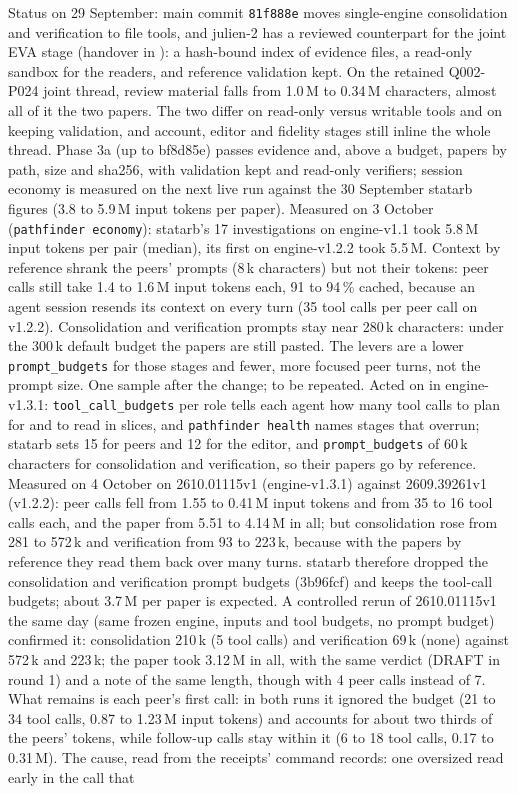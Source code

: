 \documentclass[11pt,a4paper]{article}
\begin{document}
\begin{enumerate}[label=\textbf{D\arabic*}]
  Status on 29 September: main commit \texttt{81f888e} moves single-engine
  consolidation and verification to file tools, and julien-2 has a reviewed
  counterpart for the joint EVA stage (handover in
  ):
  a hash-bound index of evidence files, a read-only sandbox for the readers, and
  reference validation kept. On the retained Q002-P024 joint thread, review
  material falls from 1.0\,M to 0.34\,M characters, almost all of it the two
  papers. The two differ on read-only versus writable tools and on keeping
  validation, and account, editor and fidelity stages still inline the whole
  thread.
  Phase 3a (up to bf8d85e) passes evidence and, above a budget, papers by path, size and sha256, with validation kept and read-only verifiers; session economy is measured on the next live run against the 30 September statarb figures (3.8 to 5.9\,M input tokens per paper). Measured on 3 October (\texttt{pathfinder economy}): statarb's 17 investigations on engine-v1.1 took 5.8\,M input tokens per pair (median), its first on engine-v1.2.2 took 5.5\,M. Context by reference shrank the peers' prompts (8\,k characters) but not their tokens: peer calls still take 1.4 to 1.6\,M input tokens each, 91 to 94\,\% cached, because an agent session resends its context on every turn (35 tool calls per peer call on v1.2.2). Consolidation and verification prompts stay near 280\,k characters: under the 300\,k default budget the papers are still pasted. The levers are a lower \texttt{prompt\_budgets} for those stages and fewer, more focused peer turns, not the prompt size. One sample after the change; to be repeated. Acted on in engine-v1.3.1: \texttt{tool\_call\_budgets} per role tells each agent how many tool calls to plan for and to read in slices, and \texttt{pathfinder health} names stages that overrun; statarb sets 15 for peers and 12 for the editor, and \texttt{prompt\_budgets} of 60\,k characters for consolidation and verification, so their papers go by reference. Measured on 4 October on 2610.01115v1 (engine-v1.3.1) against 2609.39261v1 (v1.2.2): peer calls fell from 1.55 to 0.41\,M input tokens and from 35 to 16 tool calls each, and the paper from 5.51 to 4.14\,M in all; but consolidation rose from 281 to 572\,k and verification from 93 to 223\,k, because with the papers by reference they read them back over many turns. statarb therefore dropped the consolidation and verification prompt budgets (3b96fcf) and keeps the tool-call budgets; about 3.7\,M per paper is expected. A controlled rerun of 2610.01115v1 the same day (same frozen engine, inputs and tool budgets, no prompt budget) confirmed it: consolidation 210\,k (5 tool calls) and verification 69\,k (none) against 572\,k and 223\,k; the paper took 3.12\,M in all, with the same verdict (DRAFT in round 1) and a note of the same length, though with 4 peer calls instead of 7. What remains is each peer's first call: in both runs it ignored the budget (21 to 34 tool calls, 0.87 to 1.23\,M input tokens) and accounts for about two thirds of the peers' tokens, while follow-up calls stay within it (6 to 18 tool calls, 0.17 to 0.31\,M). The cause, read from the receipts' command records: one oversized read early in the call that 
\end{enumerate}
\end{document}
